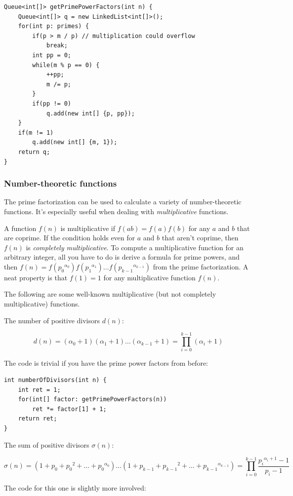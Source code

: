 \documentclass[a4paper,12pt]{article}
\begin{document}
\begin{lstlisting}
Queue<int[]> getPrimePowerFactors(int n) {
	Queue<int[]> q = new LinkedList<int[]>();
	for(int p: primes) {
		if(p > m / p) // multiplication could overflow
			break;
		int pp = 0;
		while(m % p == 0) {
			++pp;
			m /= p;
		}
		if(pp != 0)
			q.add(new int[] {p, pp});
	}
	if(m != 1)
		q.add(new int[] {m, 1});
	return q;
}
\end{lstlisting}

\subsubsection{Number-theoretic functions}

The prime factorization can be used to calculate a variety of number-theoretic functions. It's especially useful when dealing with {\em multiplicative} functions.

A function $f(n)$ is multiplicative if $f(ab)=f(a)f(b)$ for any $a$ and $b$ that are coprime. If the condition holds even for $a$ and $b$ that aren't coprime, then $f(n)$ is {\em completely multiplicative}. To compute a multiplicative function for an arbitrary integer, all you have to do is derive a formula for prime powers, and then $f(n)=f({p_0}^{\alpha_0})f({p_1}^{\alpha_1})\ldots f({p_{k-1}}^{\alpha_{k-1}})$ from the prime factorization. A neat property is that $f(1)=1$ for any multiplicative function $f(n)$. 

The following are some well-known multiplicative (but not completely multiplicative) functions.

The number of positive divisors $d(n)$:

\[d(n) = (\alpha_0 + 1)(\alpha_1 + 1)\ldots(\alpha_{k-1} + 1) = \prod_{i=0}^{k-1}{(\alpha_i+1)} \]

\noindent The code is trivial if you have the prime power factors from before:

\begin{lstlisting}
int numberOfDivisors(int n) {
	int ret = 1;
	for(int[] factor: getPrimePowerFactors(n))
		ret *= factor[1] + 1;
	return ret;
}
\end{lstlisting}

\noindent The sum of positive divisors $\sigma(n)$:

\[\sigma(n) = (1 + p_0 + {p_0}^2 + \ldots + {p_0}^{\alpha_0})\ldots(1 + p_{k-1} + {p_{k-1}}^2 + \ldots + {p_{k-1}}^{\alpha_{k-1}}) = \prod_{i=0}^{k-1}{\frac{{p_i}^{\alpha_i+1} - 1}{p_i - 1}} \]

\noindent The code for this one is slightly more involved:
\end{document}

